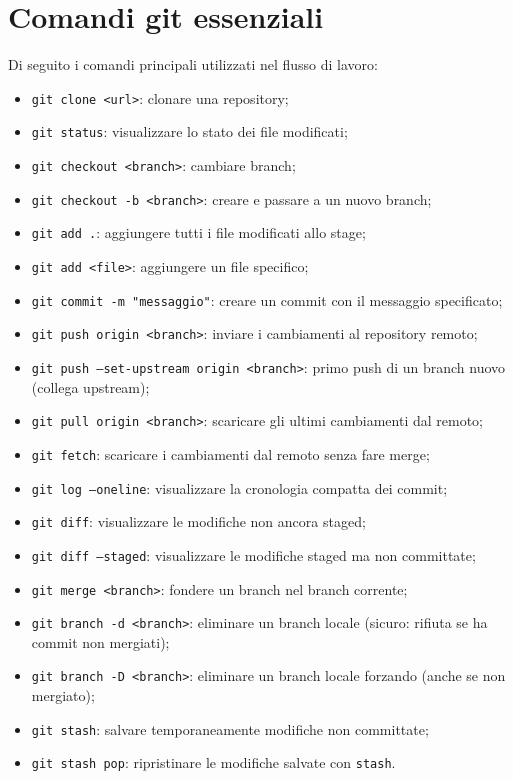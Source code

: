 \section{Comandi git essenziali}

Di seguito i comandi principali utilizzati nel flusso di lavoro:

\begin{itemize}
  \item \texttt{git clone <url>}: clonare una repository;
  \item \texttt{git status}: visualizzare lo stato dei file modificati;
  \item \texttt{git checkout <branch>}: cambiare branch;
  \item \texttt{git checkout -b <branch>}: creare e passare a un nuovo branch;
  \item \texttt{git add .}: aggiungere tutti i file modificati allo stage;
  \item \texttt{git add <file>}: aggiungere un file specifico;
  \item \texttt{git commit -m "messaggio"}: creare un commit con il messaggio specificato;
  \item \texttt{git push origin <branch>}: inviare i cambiamenti al repository remoto;
  \item \texttt{git push --set-upstream origin <branch>}: primo push di un branch nuovo (collega upstream);
  \item \texttt{git pull origin <branch>}: scaricare gli ultimi cambiamenti dal remoto;
  \item \texttt{git fetch}: scaricare i cambiamenti dal remoto senza fare merge;
  \item \texttt{git log --oneline}: visualizzare la cronologia compatta dei commit;
  \item \texttt{git diff}: visualizzare le modifiche non ancora staged;
  \item \texttt{git diff --staged}: visualizzare le modifiche staged ma non committate;
  \item \texttt{git merge <branch>}: fondere un branch nel branch corrente;
  \item \texttt{git branch -d <branch>}: eliminare un branch locale (sicuro: rifiuta se ha commit non mergiati);
  \item \texttt{git branch -D <branch>}: eliminare un branch locale forzando (anche se non mergiato);
  \item \texttt{git stash}: salvare temporaneamente modifiche non committate;
  \item \texttt{git stash pop}: ripristinare le modifiche salvate con \texttt{stash}.
\end{itemize}
